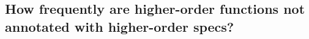 






\subsection{How frequently are higher-order functions not annotated with higher-order specs?}



